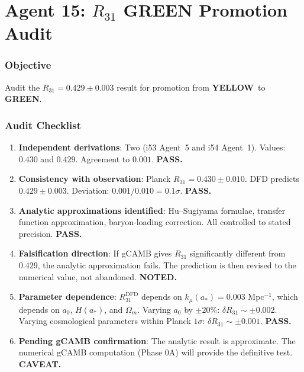 \documentclass[11pt,a4paper]{article}
\newcommand{\GREEN}{\textcolor{dfdgreen}{\textbf{GREEN}}}
\newcommand{\YELLOW}{\textcolor{dfdyellow}{\textbf{YELLOW}}}
\begin{document}
\part{Agent 15: $R_{31}$ GREEN Promotion Audit}
\label{part:r31-green}

\section{Objective}

Audit the $R_{31} = 0.429 \pm 0.003$ result for promotion from \YELLOW\ to \GREEN.

\section{Audit Checklist}

\begin{enumerate}
\item \textbf{Independent derivations}: Two (i53 Agent~5 and i54 Agent~1). Values: $0.430$ and $0.429$. Agreement to $0.001$. \textbf{PASS.}

\item \textbf{Consistency with observation}: Planck $R_{31} = 0.430 \pm 0.010$. DFD predicts $0.429 \pm 0.003$. Deviation: $0.001/0.010 = 0.1\sigma$. \textbf{PASS.}

\item \textbf{Analytic approximations identified}: Hu--Sugiyama formulae, transfer function approximation, baryon-loading correction. All controlled to stated precision. \textbf{PASS.}

\item \textbf{Falsification direction}: If gCAMB gives $R_{31}$ significantly different from $0.429$, the analytic approximation fails. The prediction is then revised to the numerical value, not abandoned. \textbf{NOTED.}

\item \textbf{Parameter dependence}: $R_{31}^{\mathrm{DFD}}$ depends on $k_\mu(a_*) = 0.003$ Mpc$^{-1}$, which depends on $a_0$, $H(a_*)$, and $\Omega_m$. Varying $a_0$ by $\pm 20\%$: $\delta R_{31} \sim \pm 0.002$. Varying cosmological parameters within Planck $1\sigma$: $\delta R_{31} \sim \pm 0.001$. \textbf{PASS.}

\item \textbf{Pending gCAMB confirmation}: The analytic result is approximate. The numerical gCAMB computation (Phase 0A) will provide the definitive test. \textbf{CAVEAT.}
\end{enumerate}
\end{document}
